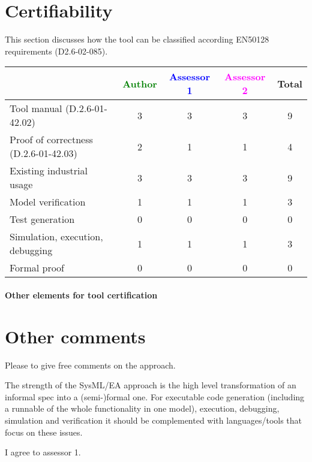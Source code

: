 \section{Certifiability}

This section discusses how the tool can be classified according EN50128 requirements (D2.6-02-085).


\begin{tabular}{|l | c | c | c | c|}
\hline
& \textcolor{green}{Author} & \textcolor{blue}{Assessor 1} & \textcolor{magenta}{Assessor 2} & Total \\
\hline 
Tool manual (D.2.6-01-42.02) &3 & 3&3 & 9 \\
\hline
Proof of correctness (D.2.6-01-42.03)   &2 & 1& 1& 4 \\
\hline
Existing industrial  usage  &3 & 3&3 & 9 \\
\hline
Model verification &1 & 1& 1& 3  \\
\hline
Test generation &0 & 0& 0& 0 \\
\hline
Simulation, execution, debugging &1 & 1&1 & 3 \\
\hline
Formal proof &0 & 0& 0& 0 \\
\hline
\end{tabular}

\paragraph{Other elements for tool certification}

\section{Other comments}
Please to  give free comments on the approach.

\begin{assessor1}
The strength of the SysML/EA approach is the high level transformation of an informal spec into a (semi-)formal one. 
For executable code generation (including a runnable of the whole functionality in one model), execution, debugging, simulation and verification it should be complemented with languages/tools that focus on these issues.
\end{assessor1}

\begin{assessor2}
I agree to assessor 1.
\end{assessor2}



